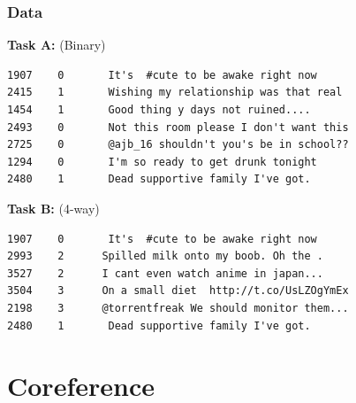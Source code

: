 \documentclass[10pt, compress]{beamer}
\begin{document}
\begin{frame}[fragile]
\frametitle{Data}

\textbf{Task A:} (Binary)

{\small
\begin{verbatim}
1907    0       It's  #cute to be awake right now
2415    1       Wishing my relationship was that real 
1454    1       Good thing y days not ruined.... 
2493    0       Not this room please I don't want this
2725    0       @ajb_16 shouldn't you's be in school??
1294    0       I'm so ready to get drunk tonight
2480    1       Dead supportive family I've got. 
\end{verbatim}
}

\textbf{Task B:} (4-way)
{\small
\begin{verbatim}
1907    0       It's  #cute to be awake right now
2993    2      Spilled milk onto my boob. Oh the .
3527    2      I cant even watch anime in japan... 
3504    3      On a small diet  http://t.co/UsLZOgYmEx
2198    3      @torrentfreak We should monitor them... 
2480    1       Dead supportive family I've got. 
\end{verbatim}
}



\end{frame}




\section{Coreference}
\end{document}
